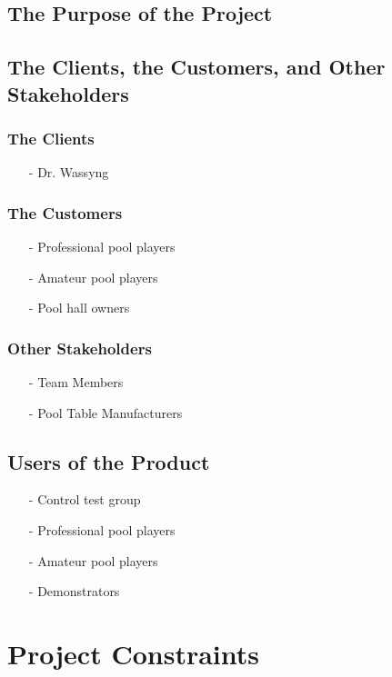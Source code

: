 \documentclass[titlepage]{article}
\begin{document}
\subsection{The Purpose of the Project}

\subsection{The Clients, the Customers, and Other Stakeholders}
\subsubsection{The Clients}
\begin{itemize}
	\item[-] Dr. Wassyng
\end{itemize}

\subsubsection{The Customers}
\begin{itemize}
	\item[-] Professional pool players
	\item[-] Amateur pool players
	\item[-] Pool hall owners
\end{itemize}

\subsubsection{Other Stakeholders}
\begin{itemize}
	\item[-] Team Members
	\item[-] Pool Table Manufacturers
\end{itemize}

\subsection{Users of the Product}
\begin{itemize}
	\item[-] Control test group
	\item[-] Professional pool players
	\item[-] Amateur pool players
	\item[-] Demonstrators
\end{itemize}


\section{Project Constraints}
\end{document}
